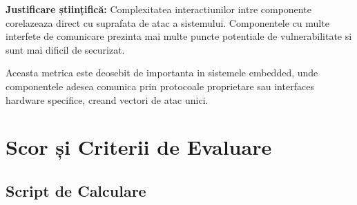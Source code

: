 \documentclass[12pt,a4paper]{article}
\begin{document}
\textbf{Justificare științifică:} Complexitatea interactiunilor intre componente corelazeaza direct cu suprafata de atac a sistemului. Componentele cu multe interfete de comunicare prezinta mai multe puncte potentiale de vulnerabilitate si sunt mai dificil de securizat.

Aceasta metrica este deosebit de importanta in sistemele embedded, unde componentele adesea comunica prin protocoale proprietare sau interfaces hardware specifice, creand vectori de atac unici.

\section{Scor și Criterii de Evaluare}

\subsection{Script de Calculare}
\end{document}
